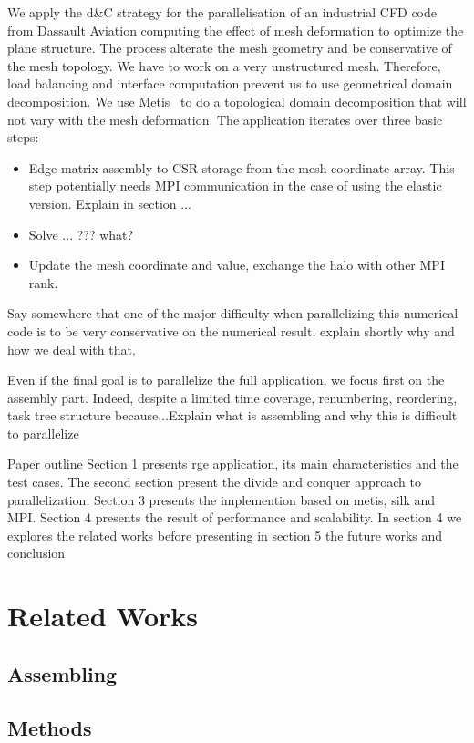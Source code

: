 \documentclass{IOS-Book-Article}
\begin{document}
We apply the d\&C strategy for the parallelisation of an industrial CFD code from Dassault Aviation computing the effect of mesh deformation to optimize the plane structure.
The process alterate the mesh geometry and be conservative of the mesh topology.  We have to work on a very unstructured mesh. Therefore, load balancing and interface
computation prevent us to use geometrical domain decomposition.
We use Metis~\cite{Metis} to do a topological domain decomposition that will not vary with the mesh deformation.
The application iterates over three basic steps:
\begin{itemize}
\item Edge matrix assembly to CSR storage from the mesh coordinate array. This step potentially needs MPI communication in the case of using the elastic version.
Explain in section ...
\item Solve ... ??? what?
\item Update the mesh coordinate and value, exchange the halo with other MPI rank.
\end{itemize}
Say somewhere that one of the major difficulty when parallelizing this numerical code is to be very conservative on the numerical result. explain shortly why and how we deal with that.


Even if the final goal is to parallelize the full application, we focus first on the assembly part. Indeed, despite a limited time coverage, renumbering, reordering,
task tree structure because...Explain what is assembling and why this is difficult to parallelize



Paper outline
Section 1 presents rge application, its main characteristics and the test cases.
The second section present the divide and conquer approach to parallelization. 
Section 3 presents the implemention based on metis, silk and MPI.
Section 4 presents the result of performance and scalability. 
In section 4 we explores the related works before presenting in section 5 the future works and conclusion

\section{Related Works}
\subsection{Assembling}
\subsection{Methods}
\end{document}
